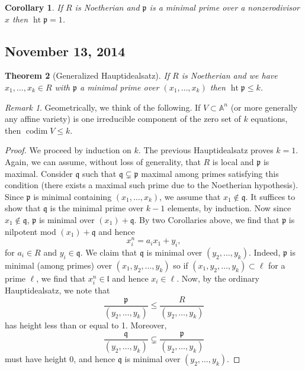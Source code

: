 \documentclass{article}
\newcommand{\fr}{\mathfrak}
\newcommand{\A}{\mathbb{A}}
\DeclareMathOperator{\codim}{codim}
\DeclareMathOperator{\hgt}{ht}
\theoremstyle{plain}
\newtheorem{thm}{Theorem}
\newtheorem{cor}[thm]{Corollary}
\theoremstyle{definition}
\theoremstyle{remark}
\newtheorem*{rem}{Remark}
\begin{document}
\begin{cor}
    If $R$ is Noetherian and $\fr p$ is a minimal prime over a nonzerodivisor $x$ then $\hgt\fr p=1$.
\end{cor}

\subsection*{November 13, 2014}

\begin{thm}[Generalized Hauptidealsatz]
    If $R$ is Noetherian and we have $x_1,\ldots,x_k\in R$ with $\fr p$ a minimal
    prime over $(x_1,\ldots,x_k)$ then $\hgt\fr p\leq k$.
\end{thm}

\begin{rem}
    Geometrically, we think of the following. If $V\subset\A^n$ (or more generally any affine
    variety) is one irreducible component of the zero set of $k$ equations, then
    $\codim V\leq k$.
\end{rem}

\begin{proof}
    We proceed by induction on $k$. The previous Hauptidealsatz proves $k=1$.
    Again, we can assume, without loss of generality, that $R$ is local and $\fr p$ is maximal.
    Consider $\fr q$ such that $\fr q\subsetneq \fr p$ maximal among primes satisfying
    this condition (there exists a maximal such prime due to the Noetherian hypothesis).
    Since $\fr p$ is minimal containing $(x_1,\ldots,x_k)$, we assume that $x_1\notin\fr q$.
    It suffices to show that $\fr q$ is the minimal prime over $k-1$ elements, by induction.
    Now since $x_1\notin\fr q$, $\fr p$ is minimal over $(x_1)+\fr q$. By two Corollaries above,
    we find that $\fr p$ is nilpotent mod $(x_1)+\fr q$ and hence
    \[x_i^n=a_ix_1+y_i,\]
    for $a_i\in R$ and $y_i\in\fr q$. We claim that $\fr q$ is minimal over $(y_2,\ldots,y_k)$.
    Indeed, $\fr p$ is minimal (among primes) over $(x_1,y_2,\ldots,y_k)$ so if $(x_1,y_2,\ldots,y_k)\subset\ell$
    for a prime $\ell$, we find that $x_i^n\in\fr l$ and hence $x_i\in\ell$. Now, by the
    ordinary Hauptidealsatz, we note that
    \[\frac{\fr p}{(y_2,\ldots,y_k)}\leq \frac{R}{(y_2,\ldots,y_k)}\]
    has height less than or equal to 1. Moreover,
    \[\frac{\fr q}{(y_2,\ldots,y_k)}\subsetneq\frac{\fr p}{(y_2,\ldots,y_k)}\]
    must have height 0, and hence $\fr q$ is minimal over $(y_2,\ldots,y_k)$.
\end{proof}
\end{document}
